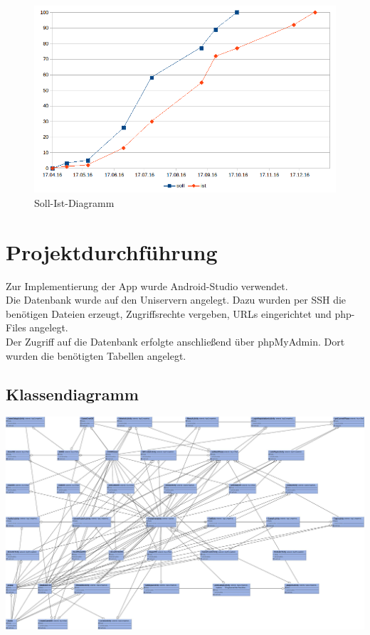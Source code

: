 \documentclass[12pt, a4paper]{article}
\begin{document}
\begin{figure}[h] 
  \centering
     \includegraphics[height = 10 cm, width = 14cm]{soll_ist_diagramm.png}
  \caption{Soll-Ist-Diagramm}
\end{figure}	

\section{Projektdurchführung}

Zur Implementierung der App wurde Android-Studio verwendet. \\
Die Datenbank wurde auf den Uniservern angelegt. Dazu wurden per SSH die benötigen Dateien erzeugt, Zugriffsrechte vergeben, URLs eingerichtet und php-Files angelegt.\\
Der Zugriff auf die Datenbank erfolgte anschließend über phpMyAdmin. Dort wurden die benötigten Tabellen angelegt.
		
	\subsection{Klassendiagramm}
		
\includegraphics[width = 15 cm, height = 8 cm]{WUML}
		
\end{document}
